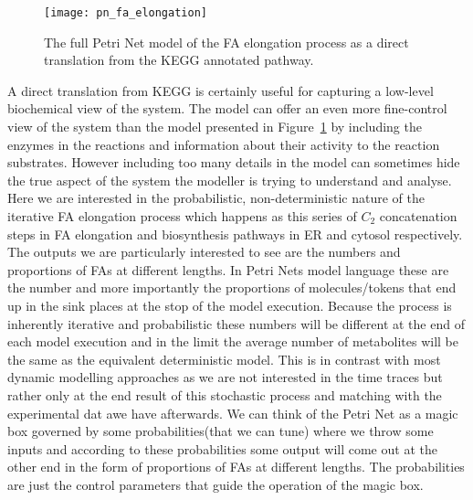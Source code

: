 \begin{figure}[htbp!]
\centering
\texttt{[image: pn\_fa\_elongation]}
\caption[FA elongation Petri Net model]{The full Petri Net model of
  the FA elongation process as a direct translation from the KEGG
  annotated pathway.}
\label{fig:pn_fa_elongation}
\end{figure}

A direct translation from KEGG is certainly useful for capturing a
low-level biochemical view of the system. The model can offer an even
more fine-control view of the system than the model presented in
Figure~\ref{fig:pn_fa_elongation} by including the enzymes in the
reactions and information about their activity to the reaction
substrates. However including too many details in the model can
sometimes hide the true aspect of the system the modeller is trying to
understand and analyse. Here we are interested in the probabilistic,
non-deterministic nature of the iterative FA elongation process which
happens as this series of $C_2$ concatenation steps in FA elongation
and biosynthesis pathways in ER and cytosol respectively. The outputs
we are particularly interested to see are the numbers and proportions of FAs at
different lengths. In Petri Nets model language these are the number
and more importantly the proportions
of molecules/tokens that end up in the sink places at the stop of the model
execution. Because the process is inherently iterative and
probabilistic these numbers will be different at the end of each model
execution and in the limit the average number of metabolites will be
the same as the equivalent deterministic model. This is in contrast with most dynamic modelling approaches
as we are not interested in the time traces but rather only at the end
result of this stochastic process and matching with the experimental
dat awe have afterwards. We can think of the Petri Net as a
magic box governed by some probabilities(that we can tune) where we
throw some inputs and according to these probabilities some output
will come out at the other end in the form of proportions of FAs at different
lengths. The probabilities are just the control parameters that guide
the operation of the magic box.

